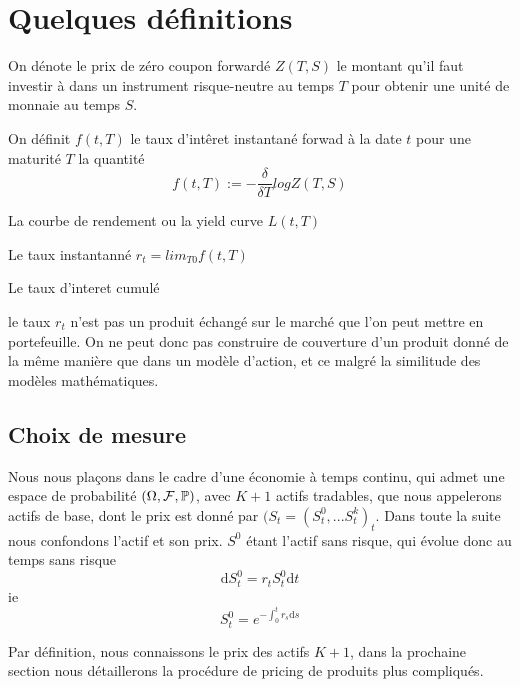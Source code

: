 

\section{Quelques définitions}


\begin{defn}
On dénote le prix de zéro coupon forwardé $Z(T, S)$ le montant qu'il faut investir à dans un instrument risque-neutre au temps $T$ pour obtenir une unité de monnaie au temps $S$.
\end{defn}

\begin{defn}
On définit $f(t, T)$ le taux d'intêret instantané forwad à la date $t$ pour une maturité $T$ la quantité $$f(t, T) := - \frac{ \delta}{\delta T}  log Z(T, S)$$
\end{defn}
\begin{defn}
La courbe de rendement ou la yield curve $L(t, T)$
\end{defn}

\begin{defn} Le taux instantanné
$r_t = lim_{T 0}f(t, T) $ 
\end{defn}

\begin{defn}
Le taux d'interet cumulé
\end{defn}
le taux $r_t$ n’est pas un produit échangé sur le marché que l’on peut mettre en portefeuille. On ne peut donc pas construire de couverture d’un produit donné de la même manière que dans un modèle d’action, et ce malgré la similitude des modèles mathématiques.

\subsection{Choix de mesure}

Nous nous plaçons dans le cadre d'une économie à temps continu, qui admet une espace de probabilité $(\Omega, \cal{F}, \mathbb{P})$, avec $K+1$ actifs tradables, que nous appelerons actifs de base, dont le prix est donné par $(S_t = (S^0_t, ...S^k_t)_t$. Dans toute la suite nous confondons l'actif et son prix.
$S^0$ étant l'actif sans risque, qui évolue donc au temps sans risque $$\mathrm{d}S^0_t = r_t S^0_t \mathrm{d}t$$
ie $$S^0_t = e^{-\int_0^t r_s \mathrm{d}s}$$

Par définition, nous connaissons le prix des actifs $K+1$, dans la prochaine section nous détaillerons la procédure de pricing de produits plus compliqués.



